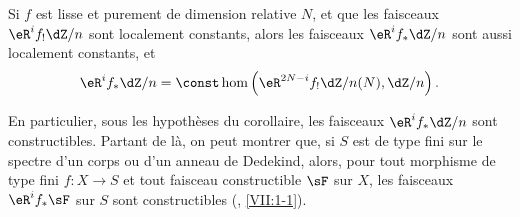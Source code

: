 \begin{corollary}\label{I:6-4-1}
Si $f$ est lisse et purement de dimension relative $N$, et que les faisceaux 
$\eR^i f_! \dZ/n$ sont localement constants, alors les faisceaux 
$\eR^i f_* \dZ/n$ sont aussi localement constants, et 
\[
  \eR^i f_* \dZ/n = \const\hom\left(\eR^{2 N-i} f_! \dZ/n(N),\dZ/n\right)\text{.}
\]
\end{corollary}

En particulier, sous les hypothèses du corollaire, les faisceaux 
$\eR^i f_* \dZ/n$ sont constructibles. Partant de là, on peut montrer que, si 
$S$ est de type fini sur le spectre d'un corps ou d'un anneau de Dedekind, 
alors, pour tout morphisme de type fini $f:X\to S$ et tout faisceau 
constructible $\sF$ sur $X$, les faisceaux $\eR^i f_* \sF$ sur $S$ sont constructibles 
(, \ref{VII:1-1}). 

